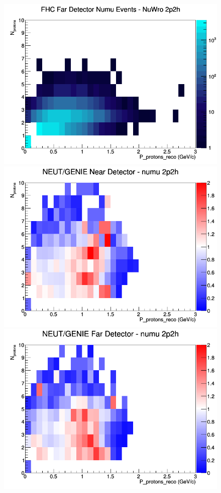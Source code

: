 \documentclass[12pt]{article}
\begin{document}
\begin{figure}[h]
\endminipage
{}
\includegraphics[width=\linewidth]{eff_N_P/LAr/protons/2p2h_FHC_FD_numu_N_P_NuWro.png}
\endminipage
\newline
{}
\includegraphics[width=\linewidth]{eff_N_P/LAr/protons/ratios/2p2h_NEUT_GENIE_numu_near_N_P.png}
\endminipage
{}
\includegraphics[width=\linewidth]{eff_N_P/LAr/protons/ratios/2p2h_NEUT_GENIE_numu_far_N_P.png}

\end{figure}
\end{document}
